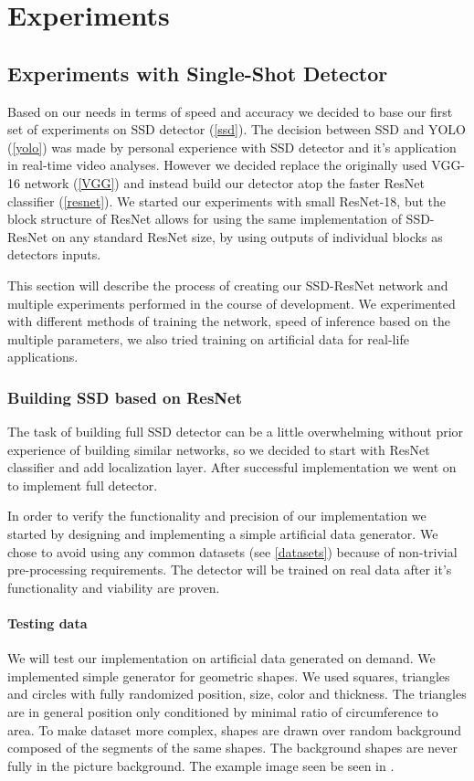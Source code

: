 \chapter{Experiments}
\section{Experiments with Single-Shot Detector}
\label{chapt:experiments}
Based on our needs in terms of speed and accuracy we decided to base our first set of experiments on SSD detector (\cref{ssd}). The decision between SSD and YOLO (\cref{yolo}) was made by personal experience with SSD detector and it's application in real-time video analyses. However we decided replace the originally used VGG-16 network (\cref{VGG}) and instead build our detector atop the faster ResNet classifier (\cref{resnet}). We started our experiments with small ResNet-18, but the block structure of ResNet allows for using the same implementation of SSD-ResNet on any standard ResNet size, by using outputs of individual blocks as detectors inputs.

This section will describe the process of creating our SSD-ResNet network and multiple experiments performed in the course of development. We experimented with different methods of training the network, speed of inference based on the multiple parameters, we also tried training on artificial data for real-life applications.


\subsection{Building SSD based on ResNet}
The task of building full SSD detector can be a little overwhelming without prior experience of building similar networks, so we decided to start with ResNet classifier and add localization layer. After successful implementation we went on to implement full detector. 

In order to verify the functionality and precision of our implementation we started by designing and implementing a simple artificial data generator. We chose to avoid using any common datasets (see \cref{datasets}) because of non-trivial pre-processing requirements. The detector will be trained on real data after it's functionality and viability are proven.

\subsubsection{Testing data}
We will test our implementation on artificial data generated on demand. We implemented simple generator for geometric shapes. We used squares, triangles and circles with fully randomized position, size, color and thickness. The triangles are in general position only conditioned by minimal ratio of circumference to area.
To make dataset more complex, shapes are drawn over random background composed of the segments of the same shapes. The background shapes are never fully in the picture background. The example image seen be seen in .




